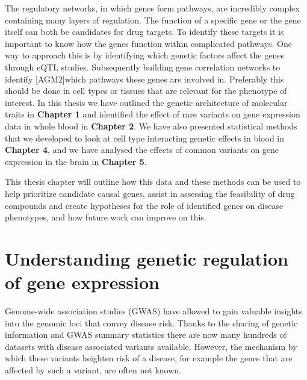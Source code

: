 The regulatory networks, in which genes form pathways, are incredibly complex containing many layers of regulation. The function of a specific gene or the gene itself can both be candidates for drug targets. To identify these targets it is important to know how the genes function within complicated pathways. One way to approach this is by identifying which genetic factors affect the genes through eQTL studies. Subsequently building gene correlation networks to identify [AGM2]which pathways these genes are involved in. Preferably this should be done in cell types or tissues that are relevant for the phenotype of interest. In this thesis we have outlined the genetic architecture of molecular traits in \textbf{Chapter 1}\cite{claringbouldGeneticArchitectureMolecular2017} and identified the effect of rare variants on gene expression data in whole blood in \textbf{Chapter 2}\cite{kleinImbalancedExpressionPredicted2020}. We have also presented statistical methods that we developed to look at cell type interacting genetic effects in blood in \textbf{Chapter 4}\cite{raulaguirre-gamboaDeconvolutionBulkBlood2020}, and we have analysed the effects of common variants on gene expression in the brain in \textbf{Chapter 5}. 

This thesis chapter will outline how this data and these methods can be used to help prioritize candidate causal genes, assist in assessing the feasibility of drug compounds and create hypotheses for the role of identified genes on disease phenotypes, and how future work can improve on this.

\section{Understanding genetic regulation of gene expression}
Genome-wide association studies (GWAS) have allowed to gain valuable insights into the genomic loci that convey disease risk.  Thanks to the sharing of genetic information and GWAS summary statistics there are now many hundreds of datasets with disease associated variants available\cite{visscher10YearsGWAS2017}. However, the mechanism by which these variants heighten risk of a disease, for example the genes that are affected by such a variant, are often not known. 

